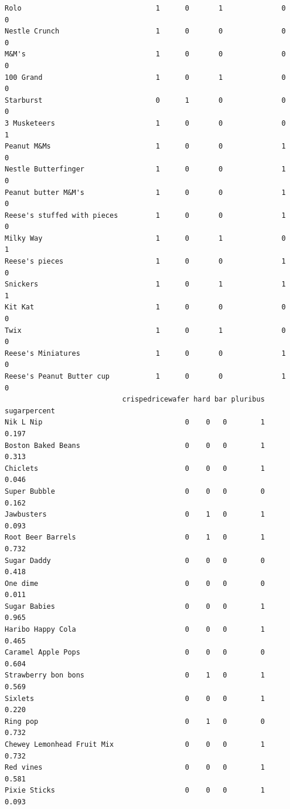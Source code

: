 \documentclass[
  letterpaper,
  DIV=11,
  numbers=noendperiod]{scrartcl}
\begin{document}
\begin{verbatim}
Rolo                                1      0       1              0      0
Nestle Crunch                       1      0       0              0      0
M&M's                               1      0       0              0      0
100 Grand                           1      0       1              0      0
Starburst                           0      1       0              0      0
3 Musketeers                        1      0       0              0      1
Peanut M&Ms                         1      0       0              1      0
Nestle Butterfinger                 1      0       0              1      0
Peanut butter M&M's                 1      0       0              1      0
Reese's stuffed with pieces         1      0       0              1      0
Milky Way                           1      0       1              0      1
Reese's pieces                      1      0       0              1      0
Snickers                            1      0       1              1      1
Kit Kat                             1      0       0              0      0
Twix                                1      0       1              0      0
Reese's Miniatures                  1      0       0              1      0
Reese's Peanut Butter cup           1      0       0              1      0
                            crispedricewafer hard bar pluribus sugarpercent
Nik L Nip                                  0    0   0        1        0.197
Boston Baked Beans                         0    0   0        1        0.313
Chiclets                                   0    0   0        1        0.046
Super Bubble                               0    0   0        0        0.162
Jawbusters                                 0    1   0        1        0.093
Root Beer Barrels                          0    1   0        1        0.732
Sugar Daddy                                0    0   0        0        0.418
One dime                                   0    0   0        0        0.011
Sugar Babies                               0    0   0        1        0.965
Haribo Happy Cola                          0    0   0        1        0.465
Caramel Apple Pops                         0    0   0        0        0.604
Strawberry bon bons                        0    1   0        1        0.569
Sixlets                                    0    0   0        1        0.220
Ring pop                                   0    1   0        0        0.732
Chewey Lemonhead Fruit Mix                 0    0   0        1        0.732
Red vines                                  0    0   0        1        0.581
Pixie Sticks                               0    0   0        1        0.093

\end{verbatim}
\end{document}
